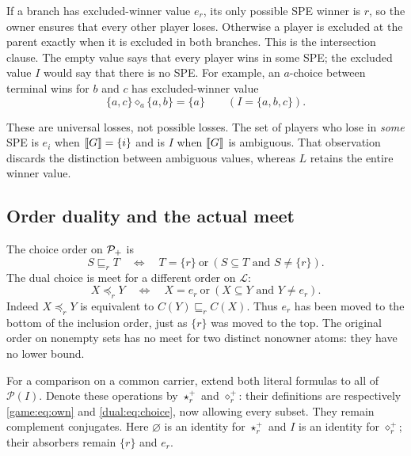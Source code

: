 If a branch has excluded-winner value $e_r$, its only possible SPE
winner is $r$, so the owner ensures that every other player loses.
Otherwise a player is excluded at the parent exactly when it is excluded
in both branches. This is the intersection clause. The empty value says
that every player wins in some SPE; the excluded value $I$ would say
that there is no SPE. For example, an $a$-choice between terminal wins
for $b$ and $c$ has excluded-winner value
\[
 \{a,c\}\diamond_a\{a,b\}=\{a\}
 \qquad(I=\{a,b,c\}).
\]

These are universal losses, not possible losses. The set of players who
lose in \emph{some} SPE is $e_i$ when $\llbracket G\rrbracket=\{i\}$ and is $I$
when $\llbracket G\rrbracket$ is ambiguous. That observation discards the distinction
between ambiguous values, whereas $L$ retains the entire winner value.

\subsection{Order duality and the actual meet}

The choice order on $\mathcal P_+$ is
\[
 S\sqsubseteq_r T
 \quad\Longleftrightarrow\quad
 T=\{r\}\ \text{or}\ (S\subseteq T\text{ and }S\ne\{r\}).
\]
The dual choice is meet for a different order on $\mathcal L$:
\begin{equation}\label{dual:eq:order}
 X\preceq_r Y
 \quad\Longleftrightarrow\quad
 X=e_r\ \text{or}\ (X\subseteq Y\text{ and }Y\ne e_r).
\end{equation}
Indeed $X\preceq_r Y$ is equivalent to
$C(Y)\sqsubseteq_r C(X)$. Thus $e_r$ has been moved to the bottom
of the inclusion order, just as $\{r\}$ was moved to the top.
The original order on nonempty sets has no meet for two distinct
nonowner atoms: they have no lower bound.

For a comparison on a common carrier, extend both literal formulas to
all of $\mathcal P(I)$. Denote these operations by $\star_r^+$ and
$\diamond_r^+$: their definitions are respectively
\eqref{game:eq:own} and \eqref{dual:eq:choice}, now allowing every
subset. They remain complement conjugates. Here
$\varnothing$ is an identity for $\star_r^+$ and $I$ is an identity
for $\diamond_r^+$; their absorbers remain $\{r\}$ and $e_r$.

